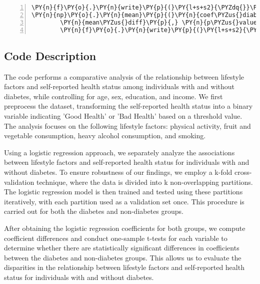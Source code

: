 \documentclass[12pt]{article}
\begin{document}
\begin{Verbatim}[commandchars=\\\{\},numbers=left,firstnumber=1,stepnumber=1,formatcom=\footnotesize]
\PY{n}{f}\PY{o}{.}\PY{n}{write}\PY{p}{(}\PY{l+s+s2}{\PYZdq{}}\PY{l+s+si}{\PYZob{}:\PYZlt{}20\PYZcb{}}\PY{l+s+se}{\PYZbs{}t}\PY{l+s+si}{\PYZob{}:\PYZlt{}12.4f\PYZcb{}}\PY{l+s+se}{\PYZbs{}t}\PY{l+s+si}{\PYZob{}:\PYZlt{}12.4f\PYZcb{}}\PY{l+s+se}{\PYZbs{}t}\PY{l+s+si}{\PYZob{}:\PYZlt{}16.4f\PYZcb{}}\PY{l+s+se}{\PYZbs{}t}\PY{l+s+si}{\PYZob{}:\PYZlt{}16.4f\PYZcb{}}\PY{l+s+se}{\PYZbs{}n}\PY{l+s+s2}{\PYZdq{}}\PY{o}{.}\PY{n}{format}\PY{p}{(}\PY{n}{var}\PY{p}{,} \PYZbs{}
\PY{n}{np}\PY{o}{.}\PY{n}{mean}\PY{p}{(}\PY{n}{coef\PYZus{}diabetes}\PY{p}{[}\PY{p}{:}\PY{p}{,} \PY{n}{i}\PY{p}{]}\PY{p}{)}\PY{p}{,} \PY{n}{np}\PY{o}{.}\PY{n}{mean}\PY{p}{(}\PY{n}{coef\PYZus{}no\PYZus{}diabetes}\PY{p}{[}\PY{p}{:}\PY{p}{,} \PY{n}{i}\PY{p}{]}\PY{p}{)}\PY{p}{,} \PYZbs{}
        \PY{n}{mean\PYZus{}diff}\PY{p}{,} \PY{n}{p\PYZus{}value}\PY{p}{)}\PY{p}{)}
        \PY{n}{f}\PY{o}{.}\PY{n}{write}\PY{p}{(}\PY{l+s+s2}{\PYZdq{}}\PY{l+s+se}{\PYZbs{}n}\PY{l+s+s2}{\PYZdq{}}\PY{p}{)}
\end{Verbatim}
\subsection{Code Description}

The code performs a comparative analysis of the relationship between lifestyle factors and self-reported health status among individuals with and without diabetes, while controlling for age, sex, education, and income. We first preprocess the dataset, transforming the self-reported health status into a binary variable indicating 'Good Health' or 'Bad Health' based on a threshold value. The analysis focuses on the following lifestyle factors: physical activity, fruit and vegetable consumption, heavy alcohol consumption, and smoking.

Using a logistic regression approach, we separately analyze the associations between lifestyle factors and self-reported health status for individuals with and without diabetes. To ensure robustness of our findings, we employ a k-fold cross-validation technique, where the data is divided into k non-overlapping partitions. The logistic regression model is then trained and tested using these partitions iteratively, with each partition used as a validation set once. This procedure is carried out for both the diabetes and non-diabetes groups.

After obtaining the logistic regression coefficients for both groups, we compute coefficient differences and conduct one-sample t-tests for each variable to determine whether there are statistically significant differences in coefficients between the diabetes and non-diabetes groups. This allows us to evaluate the disparities in the relationship between lifestyle factors and self-reported health status for individuals with and without diabetes.
\end{document}
